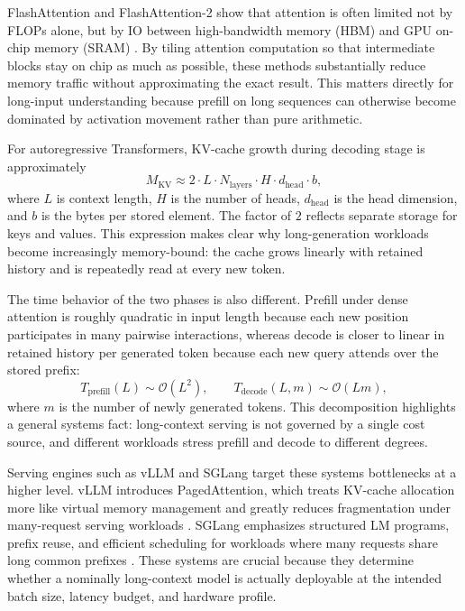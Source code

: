 \documentclass{article}
\begin{document}
FlashAttention and FlashAttention-2 show that attention is often limited not by FLOPs alone, but by IO between high-bandwidth memory (HBM) and GPU on-chip memory (SRAM) \citep{dao2022flashattention, dao2023flashattention2}. By tiling attention computation so that intermediate blocks stay on chip as much as possible, these methods substantially reduce memory traffic without approximating the exact result. This matters directly for long-input understanding because prefill on long sequences can otherwise become dominated by activation movement rather than pure arithmetic.

For autoregressive Transformers, KV-cache growth during decoding stage is approximately
\begin{equation}
M_{\mathrm{KV}} \approx 2 \cdot L \cdot N_{\mathrm{layers}} \cdot H \cdot d_{\mathrm{head}} \cdot b,
\end{equation}
where $L$ is context length, $H$ is the number of heads, $d_{\mathrm{head}}$ is the head dimension, and $b$ is the bytes per stored element. The factor of $2$ reflects separate storage for keys and values. This expression makes clear why long-generation workloads become increasingly memory-bound: the cache grows linearly with retained history and is repeatedly read at every new token.

The time behavior of the two phases is also different. Prefill under dense attention is roughly quadratic in input length because each new position participates in many pairwise interactions, whereas decode is closer to linear in retained history per generated token because each new query attends over the stored prefix:
\begin{equation}
T_{\mathrm{prefill}}(L) \sim \mathcal{O}(L^2), \qquad
T_{\mathrm{decode}}(L, m) \sim \mathcal{O}(Lm),
\end{equation}
where $m$ is the number of newly generated tokens. This decomposition highlights a general systems fact: long-context serving is not governed by a single cost source, and different workloads stress prefill and decode to different degrees.

Serving engines such as vLLM and SGLang target these systems bottlenecks at a higher level. vLLM introduces PagedAttention, which treats KV-cache allocation more like virtual memory management and greatly reduces fragmentation under many-request serving workloads \citep{kwon2023pagedattention}. SGLang emphasizes structured LM programs, prefix reuse, and efficient scheduling for workloads where many requests share long common prefixes \citep{zheng2024sglang}. These systems are crucial because they determine whether a nominally long-context model is actually deployable at the intended batch size, latency budget, and hardware profile.
\end{document}
